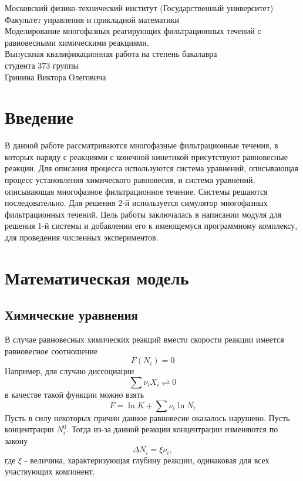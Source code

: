 \documentclass[12pt,a4paper]{article}
\begin{document}
\begin{center}
	Московский физико-технический институт (Государственный университет)\\
Факультет управления и прикладной математики\\
	\vspace{1cm} Моделирование многофазных реагирующих фильтрационных течений с 	равновесными химическими реакциями.\\
	\vspace{1cm}Выпускная квалификационная работа на степень бакалавра\\
			\vspace{1cm}студента 373 группы\\
	\vspace{1cm}Гринина Виктора Олеговича
	\vspace{4cm}
\end{center} 

\clearpage
\tableofcontents

\clearpage
\section{Введение}

В данной работе рассматриваются многофазные фильтрационные течения, в которых наряду с реакциями с конечной кинетикой присутствуют равновесные реакции. Для описания процесса используются система уравнений, описывающая процесс установления химического равновесия, и система уравнений, описывающая  многофазное фильтрационное течение. Системы решаются последовательно. Для решения 2-й используется симулятор многофазных фильтрационных течений. Цель работы заключалась в написании модуля для решения 1-й системы и добавлении его к имеющемуся программному комплексу, для проведения численных экспериментов.

\section{Математическая модель}

\subsection{Химические уравнения}

В случае равновесных химических реакций вместо скорости реакции имеется равновесное соотношение
$$F(N_i) = 0$$
Например, для случаю диссоциации 
$$\sum{\nu_i X_i} \rightleftharpoons 0$$
в качестве такой функции можно взять $$F = \ln{K} + \sum{\nu_i \ln{N_i}}$$
Пусть в силу  некоторых причин данное равновесие оказалось нарушено. Пусть концентрации $N_i^0$. Тогда из-за данной реакции концентрации изменяются по закону $$\Delta N_i = \xi \nu_i,$$ где $\xi$ - величина, характеризующая глубину реакции, одинаковая для всех участвующих компонент.
\end{document}
